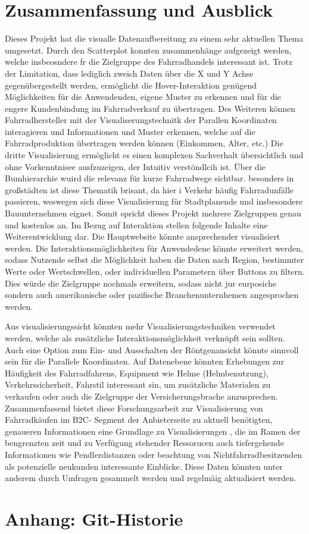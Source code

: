\documentclass[usegeometry=true]{scrartcl}
\begin{document}
\section{Zusammenfassung und Ausblick}

Dieses Projekt hat die visualle Datenaufbereitung zu einem sehr aktuellen Thema umgesetzt. Durch den Scatterplot konnten zusammenhänge aufgezeigt werden, welche insbeosndere fr die Zielgruppe des Fahrradhandels interessant ist. Trotz der Limitation, dass lediglich zweich Daten über die X und Y Achse gegenübergestellt werden, ermöglicht die Hover-Interaktion genügend Möglichkeiten für die Anwendenden, eigene Muster zu erkennen und für die engere Kundenbindung im  Fahrradverkauf zu übertragen. 
Des Weiteren können Fahrradhersteller mit der Visualiserungstechnitk der Parallen Koordinaten interagieren und Informationen und Muster erkennen, welche auf die Fahrradproduktion übertragen werden können (Einkommen, Alter, etc.)
Die dritte Visualisierung ermöglicht es einen komplexen Sachverhalt übersichtlich und ohne Vorkenntnisee ausfzuzeigen, der Intuitiv verstöndlcih ist. Über die Bumhierarchie wuird die relevanz für kurze Fahrradwege sichtbar. besonders in großstädten ist diese Thematik brisant, da hier i Verkehr häufig Fahrradunfälle passieren, weswegen sich diese Visualisierung für Stadtplanende und insbesondere Bauunternehmen eignet. 
Somit spricht dieses Projekt mehrere Zielgruppen genau und kostenlos an. 
Im Bezug auf Interaktion stellen folgende Inhalte eine Weiterentwicklung dar. Die Hauptwebsite könnte ansprechender visualisiert werden. Die Interaktionsmöglichkeiten für Anwendedene könnte erweitert werden, sodass Nutzende selbst die Möglichkeit haben die Daten nach Region, bestimmter Werte oder Wertschwellen, oder individuellen Parametern über Buttons zu filtern. Dies würde die Zielgruppe nochmals erweitern, sodass nicht jur eurposiche sondern auch amerikanische oder pazifische Branchenunternhemen angesprochen werden.


Aus visualisierungssicht könnten mehr Visualisierungstechniken verwendet werden, welche als zusätzliche Interaktionsmöglichkeit verknüpft sein sollten. Auch eine Option zum Ein- und Ausschalten der Röntgenansicht könnte sinnvoll sein für die Parallele Koordinaten. 
Auf Datenebene könnten Erhebungen zur Häufigkeit des Fahrradfahrens, Equipment wie Helme (Helmbenutzung), Verkehrssicherheit, Fahrstil interessant sin, um zusätzliche Materialen zu verkaufen oder auch die Zielgruppe der Versicherungsbrache anzusprechen. 
Zusammenfassend bietet diese Forschungsarbeit zur Visualisierung von Fahrradkäufen im B2C- Segment der Anbieterseite zu aktuell benötigten, genaueren Informationen eine Grundlage zu Visualisierungen , die im Ramen der bengrenzten zeit und zu Verfügung stehender Ressorucen auch tiefergehende Informationen wie Pendlerdistanzen oder beachtung von Nichtfahrradbesitzenden als potenzielle neukunden interessante Einblicke. Diese Daten könnten unter anderem durch Umfragen gesammelt werden und regelmäig aktualisiert werden. 


\section*{Anhang: Git-Historie}
\newpage

\end{document}
